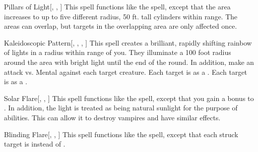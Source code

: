 \lowercase{\hypertarget{spell:Pillars of Light}{}}\label{spell:Pillars of Light}
\begin{freeability}[\nth{3}]{\hypertarget{spell:Pillars of Light}{Pillars of Light}}[, , ]
This spell functions like the  spell, except that the area increases to up to five different \areasmall radius, 50 ft. tall cylinders within range.
The areas can overlap, but targets in the overlapping area are only affected once.
\end{freeability}
\vspace{0.25em}



\lowercase{\hypertarget{spell:Kaleidoscopic Pattern}{}}\label{spell:Kaleidoscopic Pattern}
\begin{freeability}[\nth{4}]{\hypertarget{spell:Kaleidoscopic Pattern}{Kaleidoscopic Pattern}}[, , , ]
This spell creates a brilliant, rapidly shifting rainbow of lights in a \areasmall radius within \rngmed range of you.
They illuminate a 100 foot radius around the area with bright light until the end of the round.
In addition, make an attack vs. Mental against each target creature.
\hit Each target is \dazed as a .
\crit Each target is \disoriented as a .
\end{freeability}
\vspace{0.25em}



\lowercase{\hypertarget{spell:Solar Flare}{}}\label{spell:Solar Flare}
\begin{freeability}[\nth{4}]{\hypertarget{spell:Solar Flare}{Solar Flare}}[, , ]
This spell functions like the  spell, except that you gain a  bonus to .
In addition, the light is treated as being natural sunlight for the purpose of abilities.
This can allow it to destroy vampires and have similar effects.
\end{freeability}
\vspace{0.25em}



\lowercase{\hypertarget{spell:Blinding Flare}{}}\label{spell:Blinding Flare}
\begin{freeability}[\nth{6}]{\hypertarget{spell:Blinding Flare}{Blinding Flare}}[, , ]
This spell functions like the  spell, except that each struck target is  instead of .
\end{freeability}
\vspace{0.25em}



